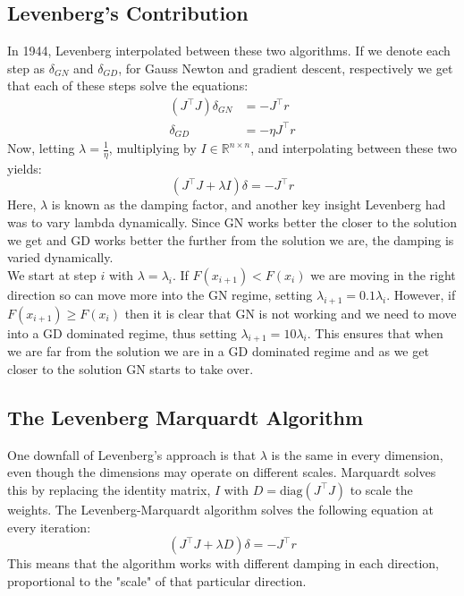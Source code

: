 \documentclass[12pt,a4paper]{report}
\theoremstyle{definition}
\begin{document}
\subsection{Levenberg's Contribution}
In 1944, Levenberg \cite{levenberg1944} interpolated between these two algorithms. If we denote each step as $\delta_{GN}$ and $\delta_{GD}$, for Gauss Newton and gradient descent, respectively we get that each of these steps solve the equations:
\begin{align}
  (J^\top J) \delta_{GN} &= - J^\top r \\
  \delta_{GD} &= -\eta J^\top r
\end{align}
Now, letting $\lambda = \frac{1}{\eta}$, multiplying by $I \in \mathbb{R}^{n \times n}$, and interpolating between these two yields:
\begin{equation}
  \label{eq:levenberg}
  \left(J^\top J + \lambda I \right)\delta = -J^\top r
\end{equation}
Here, $\lambda$ is known as the damping factor, and another key insight Levenberg had was to vary lambda dynamically. Since GN works better the closer to the solution we get and GD works better the further from the solution we are, the damping is varied dynamically.\\
We start at step $i$ with $\lambda = \lambda_i$. If $F(x_{i+1}) < F(x_i)$ we are moving in the right direction so can move more into the GN regime, setting $\lambda_{i+1} = 0.1\lambda_i$. However, if $F(x_{i+1}) \geq F(x_{i})$ then it is clear that GN is not working and we need to move into a GD dominated regime, thus setting $\lambda_{i+1} = 10\lambda_{i}$. This ensures that when we are far from the solution we are in a GD dominated regime and as we get closer to the solution GN starts to take over.

\subsection{The Levenberg Marquardt Algorithm} 
One downfall of Levenberg's approach is that $\lambda$ is the same in every dimension, even though the dimensions may operate on different scales. Marquardt \cite{marquardt1963} solves this by replacing the identity matrix, $I$ with  $D = \text{diag}\left(J^\top J\right)$ to scale the weights. The Levenberg-Marquardt algorithm solves the following equation at every iteration:
\begin{equation}
  \label{eq:lm}
  \left(J^{\top}J + \lambda D \right)\delta = -J^{\top} r 
\end{equation}
This means that the algorithm works with different damping in each direction, proportional to the "scale" of that particular direction.
\end{document}

